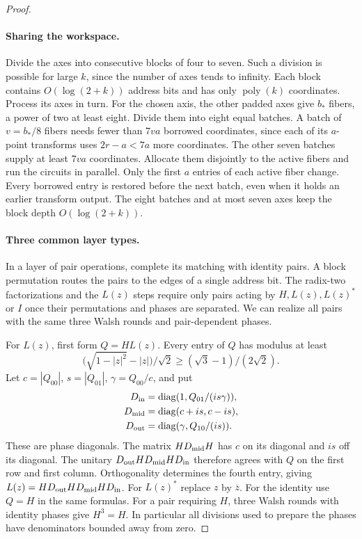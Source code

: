 \begin{proof}
\paragraph{Sharing the workspace.}
Divide the axes into consecutive blocks of four to seven. Such a
division is possible for large \(k\), since the number of axes tends
to infinity. Each block contains \(O(\log(2+k))\) address bits and
has only \(\operatorname{poly}(k)\) coordinates. Process its axes
in turn. For the chosen axis, the other padded axes give \(b_*\)
fibers, a power of two at least eight. Divide them into eight equal
batches. A batch of \(v=b_*/8\) fibers needs fewer than \(7va\)
borrowed coordinates, since each of its \(a\)-point transforms uses
\(2r-a<7a\) more coordinates. The other seven batches supply at
least \(7va\) coordinates. Allocate them disjointly to the active
fibers and run the circuits in parallel. Only the first \(a\) entries
of each active fiber change. Every borrowed entry is restored before
the next batch, even when it holds an earlier transform output.
The eight batches and at most seven axes keep the block depth
\(O(\log(2+k))\).

\paragraph{Three common layer types.}
In a layer of pair operations, complete its matching with identity
pairs. A block permutation routes the pairs to the edges of a single
address bit. The radix-two factorizations and the \(L(z)\) steps
require only pairs acting by \(H,L(z),L(z)^*\) or \(I\) once their
permutations and phases are separated. We can realize all pairs
with the same three Walsh rounds and pair-dependent phases.

For \(L(z)\), first form \(Q=H L(z)\). Every entry of \(Q\) has
modulus at least
\[
       \bigl(\sqrt{1-|z|^2}-|z|\bigr)/\sqrt2
           \ge(\sqrt3-1)/(2\sqrt2).
\]
Let \(c=|Q_{00}|\), \(s=|Q_{01}|\), \(\gamma=Q_{00}/c\), and put
\[
 \begin{aligned}
 D_{\rm in} &=\operatorname{diag}(1,Q_{01}/(is\gamma)),\\
 D_{\rm mid}&=\operatorname{diag}(c+is,c-is),\\
 D_{\rm out}&=\operatorname{diag}(\gamma,Q_{10}/(is)).
 \end{aligned}
\]
These are phase diagonals. The matrix \(HD_{\rm mid}H\) has \(c\)
on its diagonal and \(is\) off its diagonal. The unitary
\(D_{\rm out}HD_{\rm mid}HD_{\rm in}\) therefore agrees with \(Q\)
on the first row and first column. Orthogonality determines the fourth
entry, giving \(L(z)=HD_{\rm out}HD_{\rm mid}HD_{\rm in}\).
For \(L(z)^*\) replace \(z\) by \(\overline z\). For the identity
use \(Q=H\) in the same formulas. For a pair requiring \(H\), three
Walsh rounds with identity phases give \(H^3=H\).
In particular all divisions used to prepare the phases have
denominators bounded away from zero.


\end{proof}
